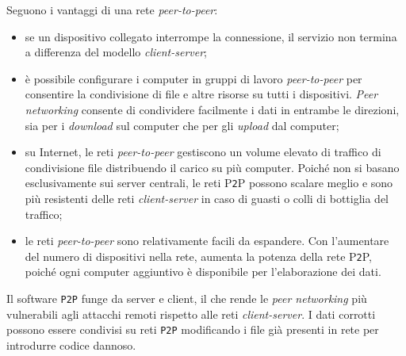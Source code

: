 Seguono i vantaggi di una rete \textit{peer-to-peer}:
\begin{itemize}
\item
se un dispositivo collegato interrompe la connessione, il servizio non termina a differenza del modello \textit{client-server};

\item 
\`{e} possibile configurare i computer in gruppi di lavoro \textit{peer-to-peer} per consentire la condivisione di file e altre risorse su tutti i dispositivi. \textit{Peer networking} consente di condividere facilmente i dati in entrambe le direzioni, sia per i \textit{download} sul computer che per gli \textit{upload} dal computer;

\item
su Internet, le reti \textit{peer-to-peer} gestiscono un volume elevato di traffico di condivisione file distribuendo il carico su pi\`{u} computer. Poich\'{e} non si basano esclusivamente sui server centrali, le reti P\verb"2"P possono scalare meglio e sono pi\`{u} resistenti delle reti \textit{client-server} in caso di guasti o colli di bottiglia del traffico;

\item
le reti \textit{peer-to-peer} sono relativamente facili da espandere. Con l'aumentare del numero di dispositivi nella rete, aumenta la potenza della rete P\verb"2"P, poich\'{e} ogni computer aggiuntivo \`{e} disponibile per l'elaborazione dei dati\cite{etichetta14}.
\end{itemize}

Il software \verb"P2P" funge da server e client, il che rende le \textit{peer networking} pi\`{u} vulnerabili agli attacchi remoti rispetto alle reti \textit{client-server}.
I dati corrotti possono essere condivisi su reti \verb"P2P" modificando i file gi\`{a} presenti in rete per introdurre codice dannoso\cite{etichetta14}.

\item
